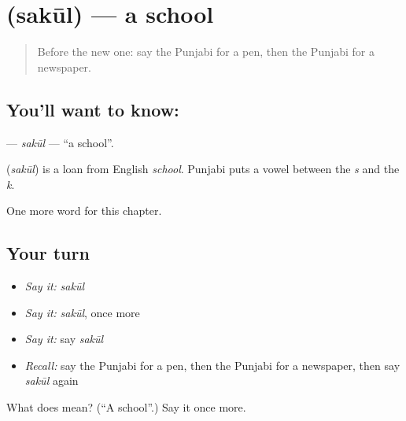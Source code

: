 \section[\texorpdfstring{\pa{ਸਕੂਲ} (sakūl)}{ਸਕੂਲ (sakūl)}]{ (sakūl) — a school}

\label{lesson:PA-C71-sakul}



\begin{quote}
Before the new one: say the Punjabi for a pen, then the Punjabi for a newspaper.
\end{quote}

\subsection*{You'll want to know: }
\textbf{} — \emph{sakūl} — \textquotedblleft{}a school\textquotedblright{}.

\begin{cousinweb}
\textbf{} (\emph{sakūl}) is a loan from English \emph{school}. Punjabi puts a vowel between the \emph{s} and the \emph{k}.
\end{cousinweb}

\begin{grammarlens}[title={What you've built}]
One more word for this chapter.
\end{grammarlens}

\subsection*{Your turn}
\begin{itemize}
\raggedright
  \item \emph{Say it:} \emph{sakūl}
  \item \emph{Say it:} \emph{sakūl}, once more
  \item \emph{Say it:} say \emph{sakūl}
  \item \emph{Recall:} say the Punjabi for a pen, then the Punjabi for a newspaper, then say \emph{sakūl} again
\end{itemize}

\begin{tcolorbox}[breakable,colback=teal!4,colframe=teal!35!black,title={Before you move on}]
What does  mean? (\textquotedblleft{}A school\textquotedblright{}.) Say it once more.
\end{tcolorbox}
